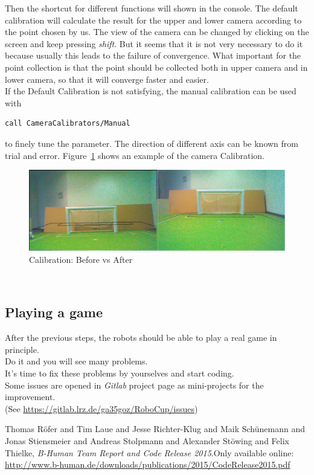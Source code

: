\documentclass[a4paper]{article}
\begin{document}
Then the shortcut for different functions will shown in the console. The default calibration will calculate the result for the upper and lower camera according to the point chosen by us. The view of the camera can be changed by clicking on the screen and keep pressing \textit{shift}. But it seems that it is not very necessary to do it because usually this leads to the failure of convergence. What important for the point collection is that the point should be collected both in upper camera and in lower camera, so that it will converge faster and easier.  \\
If the Default Calibration is not satisfying, the manual calibration can be used with
\begin{lstlisting}
call CameraCalibrators/Manual
\end{lstlisting}
to finely tune the parameter. The direction of different axis can be known from trial and error. Figure~\ref{fig: CaCl} shows an example of the camera Calibration.
\begin{figure}[!htb]
    \includegraphics[width=\textwidth]{pics/Camera_Calibration}
    \centering
    \caption{Calibration: Before vs After}
    \label{fig: CaCl}
\end{figure}\\
\subsection{Playing a game}
After the previous steps, the robots should be able to play a real game in principle. \\
Do it and you will see many problems. \\
It's time to fix these problems by yourselves and start coding.\\
Some issues are opened in \emph{Gitlab} project page as mini-projects for the improvement. \\
(See \url{https://gitlab.lrz.de/ga35goz/RoboCup/issues})

\begin{thebibliography}{9}
  Thomas R{\"o}fer and Tim Laue and Jesse Richter-Klug and Maik Sch{\"u}nemann and Jonas Stiensmeier and Andreas Stolpmann and Alexander St{\"o}wing and Felix Thielke,
  \emph{{B}-{H}uman Team Report and Code Release 2015}.Only available online: \url{http://www.b-human.de/downloads/publications/2015/CodeRelease2015.pdf}
\end{thebibliography}
\end{document}

